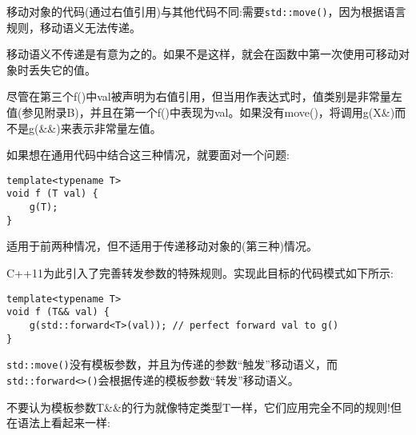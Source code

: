 移动对象的代码(通过右值引用)与其他代码不同:需要\texttt{std::move()}，因为根据语言规则，移动语义无法传递。

\begin{tcolorbox}[colback=webgreen!5!white,colframe=webgreen!75!black]
\hspace*{0.75cm}移动语义不传递是有意为之的。如果不是这样，就会在函数中第一次使用可移动对象时丢失它的值。
\end{tcolorbox}

尽管在第三个f()中val被声明为右值引用，但当用作表达式时，值类别是非常量左值(参见附录B)，并且在第一个f()中表现为val。如果没有move()，将调用g(X\&)而不是g(\&\&)来表示非常量左值。

如果想在通用代码中结合这三种情况，就要面对一个问题:

\begin{lstlisting}[style=styleCXX]
template<typename T>
void f (T val) {
	g(T);
}
\end{lstlisting}

适用于前两种情况，但不适用于传递移动对象的(第三种)情况。

C++11为此引入了完善转发参数的特殊规则。实现此目标的代码模式如下所示:

\begin{lstlisting}[style=styleCXX]
template<typename T>
void f (T&& val) {
	g(std::forward<T>(val)); // perfect forward val to g()
}
\end{lstlisting}

\texttt{std::move()}没有模板参数，并且为传递的参数“触发”移动语义，而\texttt{std::forward<>()}会根据传递的模板参数“转发”移动语义。

不要认为模板参数T\&\&的行为就像特定类型T一样，它们应用完全不同的规则!但在语法上看起来一样:

